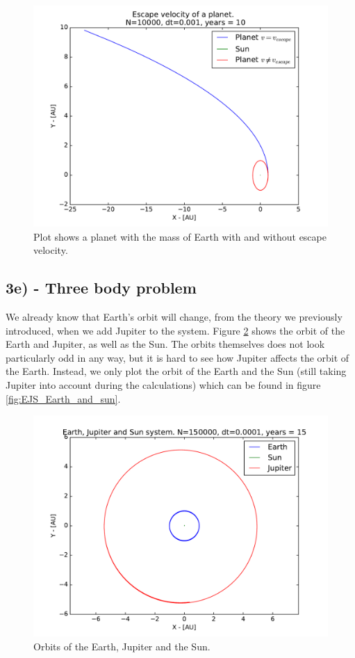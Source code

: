 \documentclass[12pt]{article}
\begin{document}
\begin{figure}[!h]
\centering
\includegraphics[width=\linewidth]{Plots/Escape_velocity.pdf}
\caption{Plot shows a planet with the mass of Earth with and without escape velocity.}
\label{fig:EscapeVel}
\end{figure}
\FloatBarrier

\subsection*{3e) - Three body problem}
We already know that Earth's orbit will change, from the theory we previously introduced, when we add Jupiter to the system. Figure \ref{fig:EJS_2D_Orbit} shows the orbit of the Earth and Jupiter, as well as the Sun. The orbits themselves does not look particularly odd in any way, but it is hard to see how Jupiter affects the orbit of the Earth. Instead, we only plot the orbit of the Earth and the Sun (still taking Jupiter into account during the calculations) which can be found in figure \ref{fig:EJS_Earth_and_sun}. 

\begin{figure}[!h]
\centering
\includegraphics[width=\linewidth]{Plots/Earth_Sun_Jupiter.pdf}
\caption{Orbits of the Earth, Jupiter and the Sun.}
\label{fig:EJS_2D_Orbit}
\end{figure}
\end{document}
